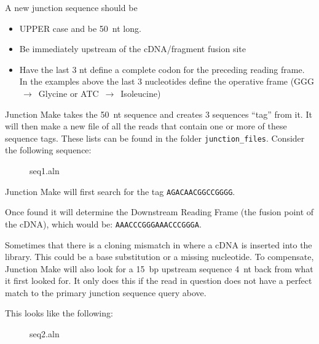 \documentclass[11pt,fleqn]{book} %
\newcommand{\JunctionMake}{{\color{Blue} Junction Make }}
\begin{document}
\begin{remark}
A new junction sequence should be 
\begin{itemize}
	\item UPPER case and be 50~nt long.
	\item Be immediately upstream of the cDNA/fragment fusion site
	\item Have the last 3 nt define a complete codon for the preceding reading frame. In the examples above the last 3 nucleotides define the operative frame (GGG $\,\to\,$ Glycine or ATC $\,\to\,$ Isoleucine)
\end{itemize}

\end{remark}


\JunctionMake takes the 50~nt sequence and creates 3 sequences ``tag'' from it.  It will then make a new file of all the reads that contain one or more of these sequence tags.  These lists can be found in the folder \texttt{junction\_files}. Consider the following sequence:

\begin{figure}[!ht]
\centering
\begin{texshade}{seq1.aln}
	\hideconsensus
	\hidenumbering
\end{texshade}
\end{figure}

\JunctionMake  will first search for the tag \texttt{AGACAACGGCCGGGG}. 

Once found it will determine the  Downstream Reading Frame (the fusion point of the cDNA), which would be: \texttt{AAACCCGGGAAACCCGGGA}.

\vspace{10pt}

Sometimes that there is a cloning mismatch in where a cDNA is inserted into the library. This could be a base substitution or a missing nucleotide. To compensate, \JunctionMake will also look for a 15~bp upstream sequence 4~nt back from what it first looked for. It only does this if the read in question does not have a perfect match to the primary junction sequence query above.

This looks like the following:
\begin{figure}[!ht]
\centering
\begin{texshade}{seq2.aln}
	\hideconsensus
	\hidenumbering
\end{texshade}
\end{figure}
\end{document}

